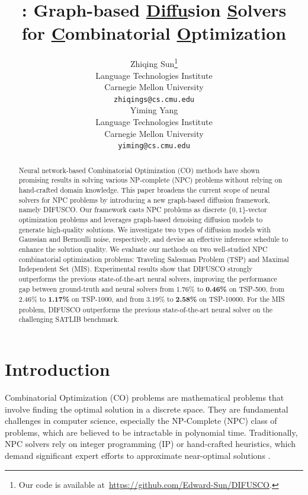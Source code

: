 \documentclass{article}
\title{\method: Graph-based \underline{Dif}f\underline{u}sion \underline{S}olvers \\ for \underline{C}ombinatorial \underline{O}ptimization}
\author{%
  Zhiqing Sun\thanks{Our code is available at~\url{https://github.com/Edward-Sun/DIFUSCO}.} \\
  Language Technologies Institute\\
  Carnegie Mellon University\\
  \texttt{zhiqings@cs.cmu.edu} \\
  \And
  Yiming Yang \\
  Language Technologies Institute\\
  Carnegie Mellon University\\
  \texttt{yiming@cs.cmu.edu} \\
}
\theoremstyle{plain}
\theoremstyle{definition}
\theoremstyle{remark}
\newcommand{\method}{DIFUSCO}
\begin{document}
\maketitle


\begin{abstract}
Neural network-based Combinatorial Optimization (CO) 
methods have shown promising results in solving various NP-complete (NPC) problems without relying on hand-crafted domain knowledge. This paper broadens the current scope of neural solvers for NPC problems by introducing a new graph-based diffusion framework, namely \method{}. 
Our framework casts NPC problems as discrete $\{0, 1\}$-vector optimization problems and leverages graph-based denoising diffusion models to generate high-quality solutions. We investigate two types of diffusion models with Gaussian and Bernoulli noise, respectively, and devise an effective inference schedule to enhance the solution quality.
We evaluate our methods on two well-studied NPC combinatorial optimization problems: Traveling Salesman Problem (TSP) and Maximal Independent Set (MIS). Experimental results show that \method{} strongly outperforms the previous state-of-the-art neural solvers, improving the performance gap between ground-truth and neural solvers from 1.76\% to \textbf{0.46\%} on TSP-500, from 2.46\% to \textbf{1.17\%} on TSP-1000, and from 3.19\% to \textbf{2.58\%} on TSP-10000. For the MIS problem, \method{} outperforms the previous state-of-the-art neural solver on the challenging SATLIB benchmark.

\end{abstract}


\section{Introduction}



Combinatorial Optimization (CO) problems are mathematical problems that involve finding the optimal solution in a discrete space. They are fundamental challenges in computer science, especially the NP-Complete (NPC) class of problems, which are believed to be intractable in polynomial time. Traditionally, NPC solvers rely on integer programming (IP) or hand-crafted heuristics, which demand significant expert efforts to approximate near-optimal solutions \citep{arora1996polynomial, gonzalez2007handbook}.
\end{document}

